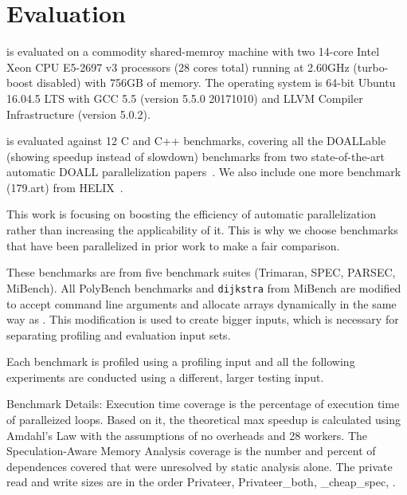 \section{Evaluation}

\name is evaluated on a commodity shared-memroy machine with two 14-core
Intel Xeon CPU E5-2697 v3 processors (28 cores total) running at 2.60GHz
(turbo-boost disabled) with 756GB of memory. The operating system is 64-bit
Ubuntu 16.04.5 LTS with GCC 5.5 (version 5.5.0 20171010) and LLVM Compiler
Infrastructure (version 5.0.2).


\name is evaluated against 12 C and C++ benchmarks, covering all the
DOALLable (showing speedup instead of slowdown) benchmarks from two
state-of-the-art automatic DOALL parallelization
papers~\cite{johnson:12:pldi,kim:12:cgo}. We also include one more
benchmark (179.art) from HELIX~\cite{simone:12:cgo}.

This work is focusing on boosting the efficiency of automatic
parallelization rather than increasing the applicability of it. This is
why we choose benchmarks that have been parallelized in prior work to
make a fair comparison.

These benchmarks are from five benchmark suites
(Trimaran\cite{trimaran:web}, SPEC\cite{}, PARSEC\cite{bienia:08:parsec},
MiBench\cite{guthaus:2001:iiwsc}). All PolyBench benchmarks and
\texttt{dijkstra} from MiBench are modified to accept command line
arguments and allocate arrays dynamically in the same way as
\cite{kim:12:cgo}. This modification is used to create bigger inputs, which
is necessary for separating profiling and evaluation input sets.

%
Each benchmark is profiled using a profiling input and all the following
experiments are conducted using a different, larger testing input.

\begin{table}[h]
  
  \caption{
    Benchmark Details: Execution time coverage is the percentage of
  execution time of paralleized loops. Based on it, the theoretical max
  speedup is calculated using Amdahl's Law with the assumptions of  no
  overheads and 28 workers. The Speculation-Aware Memory Analysis coverage
  is the number and percent of dependences covered that were unresolved by
  static analysis alone. The private read and write sizes are in the order
  Privateer, Privateer\_both, \namensp\_cheap\_spec, \namensp.}
  \label{tab:benchmark-list}
    \vspace{-5pt}
\end{table}

